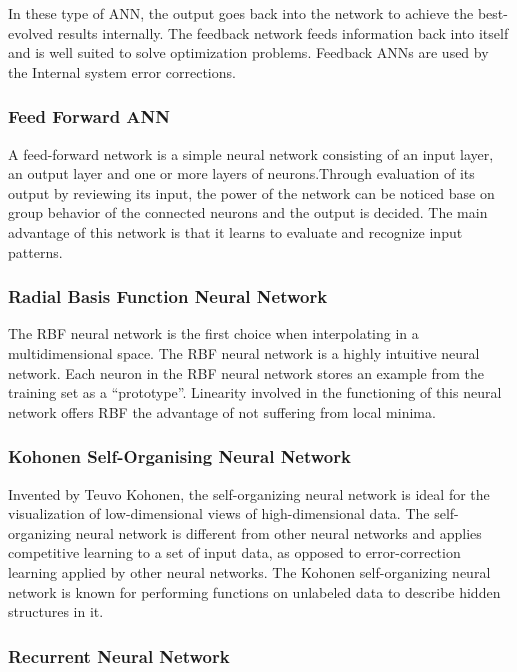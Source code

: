 In these type of ANN, the output goes back into the network to achieve the best-evolved results internally. The feedback network feeds information back into itself and is well suited to solve optimization problems. Feedback ANNs are used by the Internal system error corrections. 

\subsubsection{Feed Forward ANN}

A feed-forward network is a simple neural network consisting of an input layer, an output layer and one or more layers of neurons.Through evaluation of its output by reviewing its input, the power of the network can be noticed base on group behavior of the connected neurons and the output is decided. The main advantage of this network is that it learns to evaluate and recognize input patterns.

\subsubsection{Radial Basis Function Neural Network}

The RBF neural network is the first choice when interpolating in a multidimensional space. The RBF neural network is a highly intuitive neural network. Each neuron in the RBF neural network stores an example from the training set as a “prototype”. Linearity involved in the functioning of this neural network offers RBF the advantage of not suffering from local minima.

\subsubsection{Kohonen Self-Organising Neural Network}

Invented by Teuvo Kohonen, the self-organizing neural network is ideal for the visualization of low-dimensional views of high-dimensional data. The self-organizing neural network is different from other neural networks and applies competitive learning to a set of input data, as opposed to error-correction learning applied by other neural networks. The Kohonen self-organizing neural network is known for performing functions on unlabeled data to describe hidden structures in it.

\subsubsection{Recurrent Neural Network}

